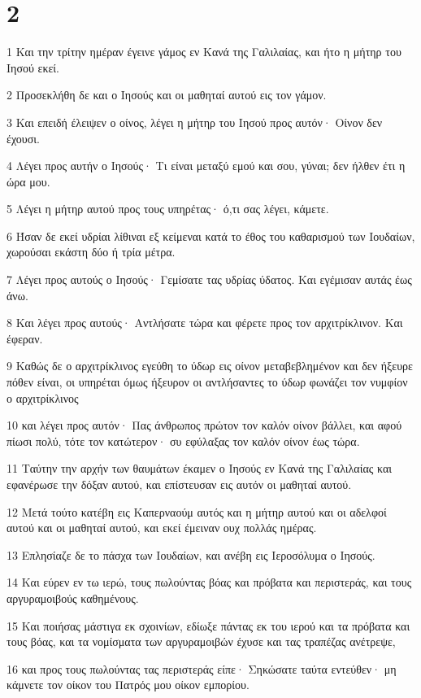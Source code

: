 \chapter{2}

\par 1 Και την τρίτην ημέραν έγεινε γάμος εν Κανά της Γαλιλαίας, και ήτο η μήτηρ του Ιησού εκεί.
\par 2 Προσεκλήθη δε και ο Ιησούς και οι μαθηταί αυτού εις τον γάμον.
\par 3 Και επειδή έλειψεν ο οίνος, λέγει η μήτηρ του Ιησού προς αυτόν· Οίνον δεν έχουσι.
\par 4 Λέγει προς αυτήν ο Ιησούς· Τι είναι μεταξύ εμού και σου, γύναι; δεν ήλθεν έτι η ώρα μου.
\par 5 Λέγει η μήτηρ αυτού προς τους υπηρέτας· ό,τι σας λέγει, κάμετε.
\par 6 Ήσαν δε εκεί υδρίαι λίθιναι εξ κείμεναι κατά το έθος του καθαρισμού των Ιουδαίων, χωρούσαι εκάστη δύο ή τρία μέτρα.
\par 7 Λέγει προς αυτούς ο Ιησούς· Γεμίσατε τας υδρίας ύδατος. Και εγέμισαν αυτάς έως άνω.
\par 8 Και λέγει προς αυτούς· Αντλήσατε τώρα και φέρετε προς τον αρχιτρίκλινον. Και έφεραν.
\par 9 Καθώς δε ο αρχιτρίκλινος εγεύθη το ύδωρ εις οίνον μεταβεβλημένον και δεν ήξευρε πόθεν είναι, οι υπηρέται όμως ήξευρον οι αντλήσαντες το ύδωρ φωνάζει τον νυμφίον ο αρχιτρίκλινος
\par 10 και λέγει προς αυτόν· Πας άνθρωπος πρώτον τον καλόν οίνον βάλλει, και αφού πίωσι πολύ, τότε τον κατώτερον· συ εφύλαξας τον καλόν οίνον έως τώρα.
\par 11 Ταύτην την αρχήν των θαυμάτων έκαμεν ο Ιησούς εν Κανά της Γαλιλαίας και εφανέρωσε την δόξαν αυτού, και επίστευσαν εις αυτόν οι μαθηταί αυτού.
\par 12 Μετά τούτο κατέβη εις Καπερναούμ αυτός και η μήτηρ αυτού και οι αδελφοί αυτού και οι μαθηταί αυτού, και εκεί έμειναν ουχ πολλάς ημέρας.
\par 13 Επλησίαζε δε το πάσχα των Ιουδαίων, και ανέβη εις Ιεροσόλυμα ο Ιησούς.
\par 14 Και εύρεν εν τω ιερώ, τους πωλούντας βόας και πρόβατα και περιστεράς, και τους αργυραμοιβούς καθημένους.
\par 15 Και ποιήσας μάστιγα εκ σχοινίων, εδίωξε πάντας εκ του ιερού και τα πρόβατα και τους βόας, και τα νομίσματα των αργυραμοιβών έχυσε και τας τραπέζας ανέτρεψε,
\par 16 και προς τους πωλούντας τας περιστεράς είπε· Σηκώσατε ταύτα εντεύθεν· μη κάμνετε τον οίκον του Πατρός μου οίκον εμπορίου.
